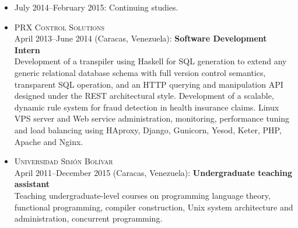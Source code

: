 \documentclass{res}
\begin{document}
\begin{resume}
\begin{itemize}[leftmargin=-0.3in]
    \item July 2014--February 2015: Continuing studies.

    \item
      \textsc{PRX Control Solutions}
      \\ April 2013--June 2014 (Caracas, Venezuela): \textbf{Software Development Intern}
      \\ \small{Development of a transpiler using Haskell for SQL generation to extend any generic relational database schema with full version control semantics, transparent SQL operation, and an HTTP querying and manipulation API designed under the REST architectural style.  Development of a scalable, dynamic rule system for fraud detection in health insurance claims.  Linux VPS server and Web service administration, monitoring, performance tuning and load balancing using HAproxy, Django, Gunicorn, Yesod, Keter, PHP, Apache and Nginx.}


    \item
      \textsc{Universidad Sim\'on Bol\'{\i}var}
      \\ April 2011--December 2015 (Caracas, Venezuela): \textbf{Undergraduate teaching assistant}
      \\ \small{Teaching undergraduate-level courses on programming language theory, functional programming, compiler construction, Unix system architecture and administration, concurrent programming.}

  \end{itemize}

\end{resume}
\end{document}
